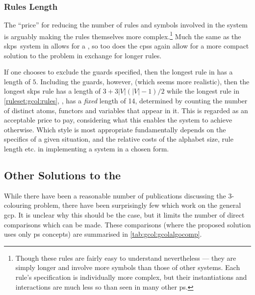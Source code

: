 \subsubsection{Rules Length}
The ``price'' for reducing the number of rules and symbols involved in the system is arguably making the rules themselves more complex.\footnote{Though these rules are fairly easy to understand nevertheless --- they are simply longer and involve more symbols than those of other systems.  Each rule's specification is individually more complex, but their instantiations and interactions are much less so than seen in many other \gls{ps}.}  Much the same as the \gls{skps}~system in \cite{Gheorghe2013} allows for a , so too does the \glspl{cps} again allow for a more compact solution to the problem in exchange for longer rules.

If one chooses to exclude the guards specified, then the longest rule in \cite{Gheorghe2013} has a length of \(5\).  Including the guards, however, (which seems more realistic), then the longest \gls{skps} rule has a length of \(3 + 3|V|(|V| - 1)/2\) while the longest rule in \cref{ruleset:gcol:rules}, , has a \emph{fixed} length of 14, determined by counting the number of distinct atoms, functors and variables that appear in it.  This is regarded as an acceptable price to pay, considering what this enables the system to achieve otherwise.  Which style is most appropriate fundamentally depends on the specifics of a given situation, and the relative costs of the alphabet size, rule length etc. in implementing a system in a chosen form.


\subsection{\label{sec:gcol:gcpsol}Other Solutions to the }

While there have been a reasonable number of publications discussing the 3-colouring problem, there have been surprisingly few which work on the general \gls{gcp}.  It is unclear why this should be the case, but it limits the number of direct comparisons which can be made.  These comparisons (where the proposed solution uses only \gls{ps} concepts) are summarised in \cref{tab:gcol:gcolalgocomp}.

